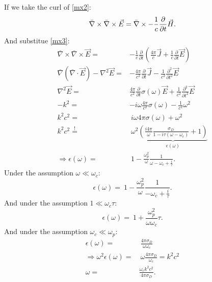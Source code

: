\documentclass[notitlepage]{report}
\begin{document}
\begin{question}[title = Question 4]{}{}
If we take the curl of \eqref{mx2}:\\
\[
\bar{\nabla}\times\bar{\nabla}\times \vec{E} =\bar{\nabla}\times-\frac{1}{c}\frac{\partial}{\partial t}\vec{H}\label{mx2}\\
.\] 
And substitue \eqref{mx3}:\\
\begin{align*}
	\bar{\nabla}\times\bar{\nabla}\times \vec{E} =& -\frac{1}{c}\frac{\partial}{\partial t}\left(\frac{4\pi}{c}\vec{J}+\frac{1}{c}\frac{\partial}{\partial t}\vec{E}\right) \\
\bar{\nabla}\left(\bar{\nabla}\cdot\vec{E}\right)-\nabla^2 \vec{E}=& -\frac{4\pi}{c^2}\frac{\partial}{\partial t}\vec{J}-\frac{1}{c^2}\frac{\partial^2}{\partial t^2}\vec{E} \\
\nabla^2 \vec{E}=& \frac{4\pi}{c^2}\frac{\partial}{\partial t}\sigma\left(\omega\right)\vec{E} +\frac{1}{c^2}\frac{\partial^2}{\partial t^2}\vec{E} \\
-k^2=&-i\omega \frac{4\pi}{c^2}\sigma\left(\omega\right)-\frac{1}{c^2}\omega^2 \\
k^2c^2=&\ i\omega4\pi\sigma\left(\omega\right)+\omega^2\\
k^2c^2\overset{!}{=}&\ \omega^2\underbrace{\left(\frac{i4\pi}{\omega}\frac{\sigma_D}{1-i\tau\left(\omega-\omega_c\right) }+1\right)}_{\epsilon\left(\omega\right) }   \\
\Rightarrow \epsilon\left(\omega\right) =&\ 1-\frac{\omega_p^2}{\omega}\frac{1}{\omega-\omega_c+\frac{i}{\tau}} 
.\end{align*}
Under the assumption $\omega\ll\omega_c$:\\
\[
\epsilon\left(\omega\right) =\ 1-\frac{\omega_p^2}{\omega}\frac{1}{-\omega_c+\frac{i}{\tau}} 
.\] 
And under the assumption $1\ll\omega_c\tau$:\\
\[
\epsilon\left(\omega\right) =\ 1+\frac{\omega_p^2}{\omega\omega_c}\tau 
.\] 
And under the assumption $\omega_c\ll\omega_p$:\\
\begin{align*}
	\epsilon\left(\omega\right) =&\ \frac{4\pi\sigma_D}{\omega\omega_c}\\ 
	\Rightarrow \omega^2\epsilon\left(\omega\right) =&\ \omega\frac{4\pi\sigma_D}{\omega_c} = k^2c^2\\
	\omega =& \frac{\omega_ck^2c^2}{4\pi\sigma_D}
.\end{align*}
\end{question}
\end{document}

